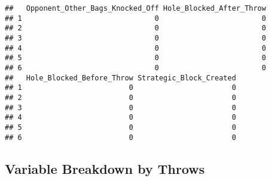 \documentclass[
]{article}
\begin{document}
\begin{verbatim}
##   Opponent_Other_Bags_Knocked_Off Hole_Blocked_After_Throw
## 1                               0                        0
## 2                               0                        0
## 3                               0                        0
## 4                               0                        0
## 5                               0                        0
## 6                               0                        0
##   Hole_Blocked_Before_Throw Strategic_Block_Created
## 1                         0                       0
## 2                         0                       0
## 3                         0                       0
## 4                         0                       0
## 5                         0                       0
## 6                         0                       0
\end{verbatim}

\hypertarget{variable-breakdown-by-throws}{%
\subsection{Variable Breakdown by
Throws}\label{variable-breakdown-by-throws}}
\end{document}
